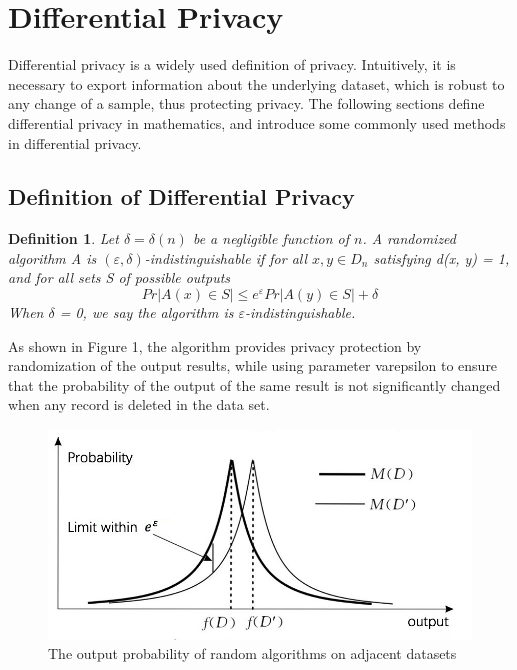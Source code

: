 \documentclass[10pt,conference]{IEEEtran}
\newtheorem{definition}{Definition}
\begin{document}
\section{Differential Privacy}
Differential privacy is a widely used definition of privacy. Intuitively, it is necessary to export information about the underlying dataset, which is robust to any change of a sample, thus protecting privacy. The following sections define differential privacy in mathematics, and introduce some commonly used methods in differential privacy.

\subsection{Definition of Differential Privacy}

\begin{definition}\cite{Nissim2007Smooth}
 Let $\delta =\delta (n)$ be a negligible function of $n$. A randomized algorithm A is $(\varepsilon ,\delta )$-indistinguishable if for all $x,y \in D_{n}$ satisfying d(x, y) = 1, and for all sets S of possible outputs
 \begin{equation}
 Pr|A(x)\in S|\leqslant e^{\varepsilon }Pr|A(y)\in S|+\delta 
 \end{equation}
 When $\delta$ = 0, we say the algorithm is $\varepsilon$-indistinguishable.
\end{definition}

As shown in Figure 1, the algorithm provides privacy protection by randomization of the output results, while using parameter varepsilon to ensure that the probability of the output of the same result is not significantly changed when any record is deleted in the data set.

\begin{figure}[h]
    \centering
    \includegraphics[scale=0.3]{varepsilon.png}
    \caption{The output probability of random algorithms on adjacent datasets}
    \label{fig:figere}
\end{figure}
\end{document}

